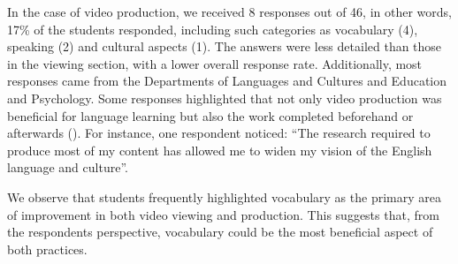 In the case of video production, we received 8 responses out of 46, in
other words, 17\% of the students responded, including such categories
as vocabulary (4), speaking (2) and cultural aspects (1). The answers
were less detailed than those in the viewing section, with a lower
overall response rate. Additionally, most responses came from the
Departments of Languages and Cultures and Education and Psychology. Some
responses highlighted that not only video production was beneficial for
language learning but also the work completed beforehand or afterwards
(). For instance, one respondent noticed: ``The research required
to produce most of my content has allowed me to widen my vision of the
English language and culture''.

We observe that students frequently highlighted vocabulary as the
primary area of improvement in both video viewing and production. This
suggests that, from the respondents\textquotesingle{} perspective,
vocabulary could be the most beneficial aspect of both practices.
